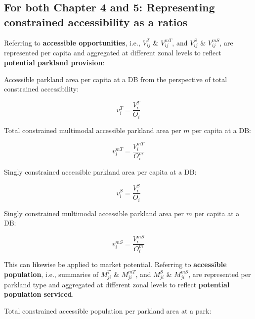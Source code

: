 \documentclass[
11pt, %
oneside, %
english, %
singlespacing, %
]{macthesis} %
\begin{document}
\subsection{For both Chapter 4 and 5: Representing constrained accessibility as a ratios}\label{for-both-chapter-4-and-5-representing-constrained-accessibility-as-a-ratios}

Referring to \textbf{accessible opportunities}, i.e., \(V_{ij}^T\) \& \(V_{ij}^{mT}\), and \(V_{ij}^{S}\) \& \(V_{ij}^{mS}\), are represented per capita and aggregated at different zonal levels to reflect \textbf{potential parkland provision}:

Accessible parkland area per capita at a DB from the perspective of total constrained accessibility:

\begin{equation}
\label{eq:total-constrained-access-per-capita}
v^{T}_{i} = \frac{V^{T}_{i}}{O_{i}}
\end{equation} 

Total constrained multimodal accessible parkland area per \(m\) per capita at a DB:

\begin{equation}
\label{eq:total-constrained-multimodal-access-per-capita}
v^{mT}_{i} = \frac{V^{mT}_{i}}{O^{m}_{i}}
\end{equation} 

Singly constrained accessible parkland area per capita at a DB:

\begin{equation}
\label{eq:singly-constrained-access-per-capita}
v^{S}_{i} = \frac{V^{S}_{i}}{O_{i}}
\end{equation} 

Singly constrained multimodal accessible parkland area per \(m\) per capita at a DB:

\begin{equation}
\label{eq:singly-constrained-multimodal-access-per-capita}
v^{mS}_{i} = \frac{V^{mS}_{i}}{O^{m}_{i}}
\end{equation} 

This can likewise be applied to market potential. Referring to \textbf{accessible population}, i.e., summaries of \(M_{ji}^T\) \& \(M_{ji}^{mT}\), and \(M_{ji}^{S}\) \& \(M_{ji}^{mS}\), are represented per parkland type and aggregated at different zonal levels to reflect \textbf{potential population serviced}.

Total constrained accessible population per parkland area at a park:
\end{document}
